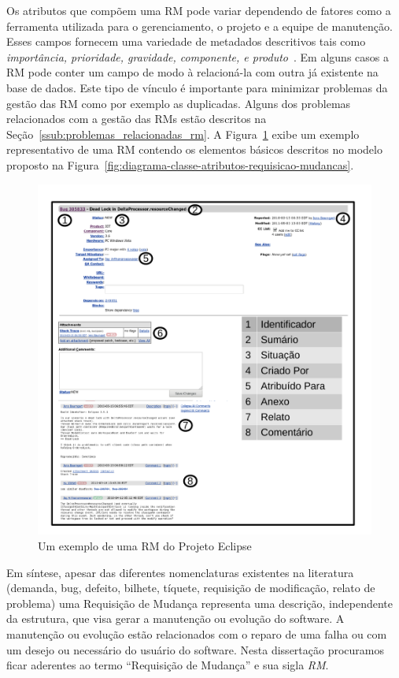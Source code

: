 Os atributos que compõem uma RM pode variar dependendo de fatores como a
ferramenta utilizada para o gerenciamento, o projeto e a equipe de manutenção.
Esses campos fornecem uma variedade de metadados descritivos tais como
\textit{importância, prioridade, gravidade, componente, e
    produto}~\cite{zhang2016literature}. Em alguns casos a RM pode conter um
campo de modo à relacioná-la com outra já existente na base de dados. Este tipo
de vínculo é importante para minimizar problemas da gestão das RM como por
exemplo as duplicadas. Alguns dos problemas relacionados com a gestão das RMs
estão descritos na Seção~\ref{ssub:problemas_relacionadas_rm}. A
Figura~\ref{fig:rm-exemplo} exibe um exemplo representativo de uma RM contendo
os elementos básicos descritos no modelo proposto na
Figura~\ref{fig:diagrama-classe-atributos-requisicao-mudancas}.

\begin{figure}[htpb]
	\centering
	\includegraphics[width=0.8\linewidth]{./chapter-manutencao-software-visao-geral/img/rm-exemplo.pdf}
	\caption{Um exemplo de uma RM do Projeto Eclipse}
\label{fig:rm-exemplo}
\end{figure}

Em síntese, apesar das diferentes nomenclaturas existentes na literatura
(demanda, bug, defeito, bilhete, tíquete, requisição de modificação, relato de
problema) uma Requisição de Mudança representa uma descrição, independente da
estrutura, que visa gerar a manutenção ou evolução do software. A manutenção ou
evolução estão relacionados com o reparo de uma falha ou com um desejo ou
necessário do usuário do software. Nesta dissertação procuramos ficar aderentes
ao termo ``Requisição de Mudança'' e sua sigla \textit{RM}.

